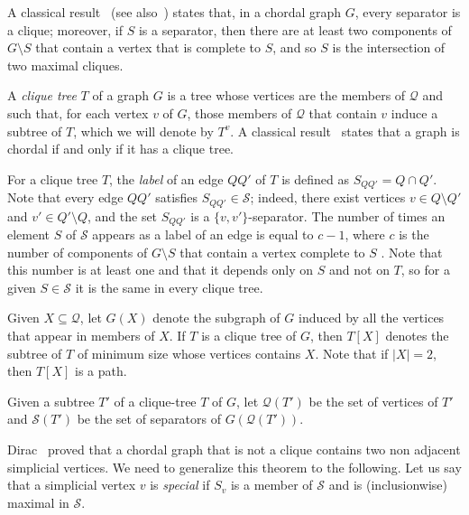 \documentclass[11pt]{article}
\begin{document}
A classical result~\cite{HajSur58,Ber60} (see also~\cite{Gol04})
states that, in a chordal graph $G$, every separator is a clique;
moreover, if $S$ is a separator, then there are at least two
components of $G\setminus S$ that contain a vertex that is complete to
$S$, and so $S$ is the intersection of two maximal cliques.

A \emph{clique tree} $T$ of a graph $G$ is a tree whose vertices are
the members of $\mathcal Q$ and such that, for each vertex $v$ of $G$,
those members of $\mathcal Q$ that contain $v$ induce a subtree of
$T$, which we will denote by $T^v$.  A classical result~\cite{Gav74}
states that a graph is chordal if and only if it has a clique tree.

For a clique tree $T$, the \emph{label} of an edge $QQ'$ of $T$ is
defined as $S_{QQ'}=Q\cap Q'$.  Note that every edge $QQ'$ satisfies
$S_{QQ'} \in\mathcal S$; indeed, there exist vertices $v\in Q\setminus
Q'$ and $v'\in Q'\setminus Q$, and the set $S_{QQ'}$ is a $\{v,
v'\}$-separator.  The number of times an element $S$ of $\mathcal S$
appears as a label of an edge is equal to $c-1$, where $c$ is the
number of components of $G\setminus S$ that contain a vertex complete
to $S$ \cite{Gav74,MacMac}.  Note that this number is at least one and
that it depends only on $S$ and not on $T$, so for a given $S\in
\mathcal S$ it is the same in every clique tree.

Given $X \subseteq \mathcal Q$, let $G(X)$ denote the subgraph of $G$
induced by all the vertices that appear in members of $X$.  If $T$ is
a clique tree of $G$, then $T[X]$ denotes the subtree of $T$ of
minimum size whose vertices contains $X$.  Note that if $|X|=2$, then
$T[X]$ is a path.

Given a subtree $T'$ of a clique-tree $T$ of $G$, let $\mathcal Q(T')$
be the set of vertices of $T'$ and $\mathcal S(T')$ be the set of
separators of $G(\mathcal Q(T'))$.

Dirac~\cite{Dir61} proved that a chordal graph that is not a clique
contains two non adjacent simplicial vertices.  We need to generalize
this theorem to the following.  Let us say that a simplicial vertex
$v$ is \emph{special} if $S_v$ is a member of $\mathcal S$ and is
(inclusionwise) maximal in $\mathcal S$.
\end{document}

